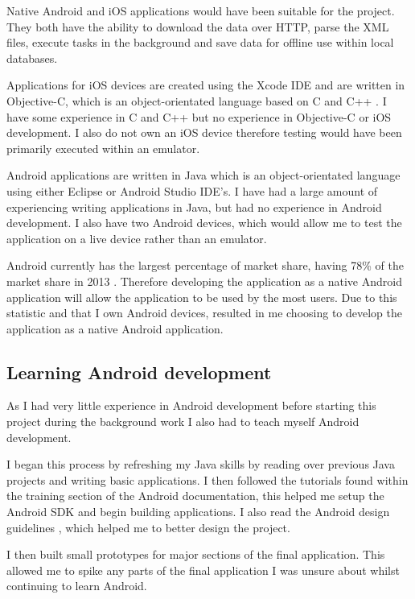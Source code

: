 Native Android \cite{android} and iOS applications would have been suitable for the project. They both have the ability to download the data over HTTP, parse the XML \cite{xml} files, execute tasks in the background and save data for offline use within local databases.

Applications for iOS \cite{ios} devices are created using the Xcode IDE and are written in Objective-C, which is an object-orientated language based on C and C++ \cite{obj_c}. I have some experience in C and C++ but no experience in Objective-C or iOS development. I also do not own an iOS device therefore testing would have been primarily executed within an emulator.

Android applications are written in Java \cite{java} which is an object-orientated language using either Eclipse \cite{eclipse} or Android Studio \cite{android_studio} IDE's. I have had a large amount of experiencing writing applications in Java, but had no experience in Android development. I also have two Android devices, which would allow me to test the application on a live device rather than an emulator.

Android currently has the largest percentage of market share, having 78\% of the market share in 2013 \cite{phone_market}. Therefore developing the application as a native Android application will allow the application to be used by the most users. Due to this statistic and that I own Android devices, resulted in me choosing to develop the application as a native Android application.

\subsection{Learning Android development}

As I had very little experience in Android \cite{android} development before starting this project during the background work I also had to teach myself Android development.

I began this process by refreshing my Java \cite{java} skills by reading over previous Java projects and writing basic applications. I then followed the tutorials found within the training section of the Android documentation, this helped me setup the Android SDK \cite{android_sdk} and begin building applications. I also read the Android design guidelines \cite{android_design}, which helped me to better design the project.

I then built small prototypes for major sections of the final application. This allowed me to spike any parts of the final application I was unsure about whilst continuing to learn Android.

